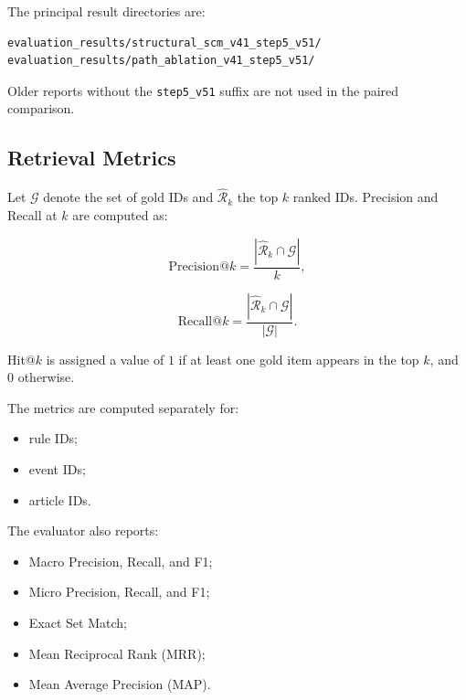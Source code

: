 The principal result directories are:

\begin{verbatim}
evaluation_results/structural_scm_v41_step5_v51/
evaluation_results/path_ablation_v41_step5_v51/
\end{verbatim}

Older reports without the \texttt{step5\_v51} suffix are not used in the
paired comparison.

\subsection{Retrieval Metrics}

Let \(\mathcal{G}\) denote the set of gold IDs and
\(\widehat{\mathcal{R}}_k\) the top \(k\) ranked IDs. Precision and Recall at
\(k\) are computed as:

\begin{equation}
\mathrm{Precision@}k
=
\frac{
    \left|
        \widehat{\mathcal{R}}_k
        \cap
        \mathcal{G}
    \right|
}{
    k
},
\end{equation}

\begin{equation}
\mathrm{Recall@}k
=
\frac{
    \left|
        \widehat{\mathcal{R}}_k
        \cap
        \mathcal{G}
    \right|
}{
    \left|\mathcal{G}\right|
}.
\end{equation}

Hit@\(k\) is assigned a value of \(1\) if at least one gold item appears in
the top \(k\), and \(0\) otherwise.

The metrics are computed separately for:

\begin{itemize}
    \item rule IDs;
    \item event IDs;
    \item article IDs.
\end{itemize}

The evaluator also reports:

\begin{itemize}
    \item Macro Precision, Recall, and F1;
    \item Micro Precision, Recall, and F1;
    \item Exact Set Match;
    \item Mean Reciprocal Rank (MRR);
    \item Mean Average Precision (MAP).
\end{itemize}

